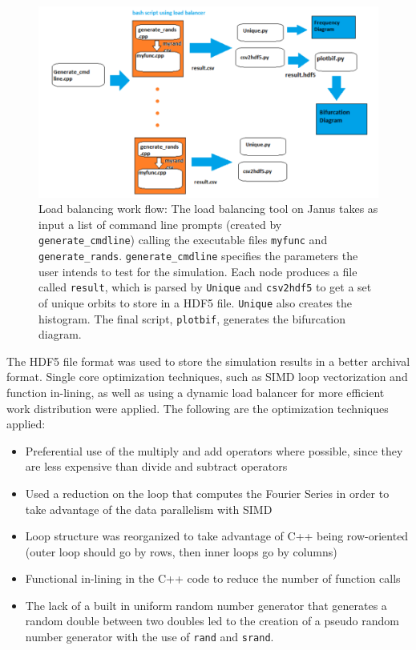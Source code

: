 \begin{figure}[htp]
\caption[Load balancing work flow]{Load balancing work flow: The load
  balancing tool on Janus takes as input a list of command line prompts
  (created by \texttt{generate\_cmdline}) calling the
  executable files \texttt{myfunc} and
  \texttt{generate\_rands}. \texttt{generate\_cmdline}
  specifies the parameters the user intends to test for the
  simulation. Each node produces a file called \texttt{result},
  which is parsed by \texttt{Unique} and \texttt{csv2hdf5} to get
  a set of unique orbits to store in a HDF5 file. \texttt{Unique} also creates the histogram. The final script, \texttt{plotbif}, generates the bifurcation diagram.}\label{fig:workflow}
	\begin{center}
          \includegraphics[scale=0.5]{figs/workflow.png}
	\end{center}
\end{figure}

The HDF5 file format was used to store the simulation results in a better
archival format. Single core optimization techniques, such as SIMD loop
vectorization and function in-lining, as well as using a dynamic load
balancer for more efficient work distribution were
applied. The following are the optimization techniques applied:
\begin{itemize}
\item Preferential use of the multiply and add operators where possible, since
they are less expensive than divide and subtract operators
\item Used a reduction on the loop that computes the Fourier Series
  in order to take advantage of the data parallelism with SIMD
\item Loop structure was reorganized to take advantage of C++ being
  row-oriented (outer loop should go by rows, then inner loops go by columns)
\item Functional in-lining in the C++ code to reduce the number of function calls
\item The lack of a built in uniform random number generator that generates a random
double between two doubles led to the creation of a pseudo random number
generator with the use of \texttt{rand} and \texttt{srand}.
\end{itemize}

